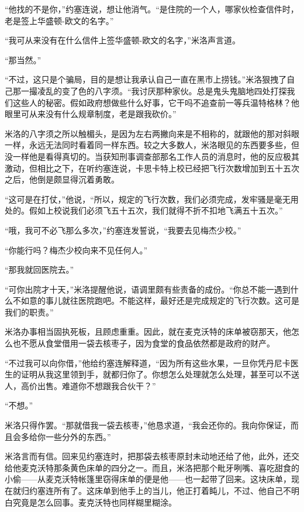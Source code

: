     “他找的不是你，”约塞连说，想让他消气。“是住院的一个人，哪家伙检查信件时，老是签上华盛顿-欧文的名字。”

    “我可从来没有在什么信件上签华盛顿-欧文的名字，”米洛声言道。

    “那当然。”

    “不过，这只是个骗局，目的是想让我承认自己一直在黑市上捞钱。”米洛狠拽了自己那一撮凌乱的变了色的八字须。“我讨厌那种家伙。总是鬼头鬼脑地四处打探我们这些人的秘密。假如政府想做些什么好事，它干吗不追查前一等兵温特格林？他眼里可从来没有什么规章制度，老是跟我砍价。”

    米洛的八字须之所以触楣头，是因为左右两撇向来是不相称的，就跟他的那对斜眼一样，永远无法同时看着同一样东西。较之大多数人，米洛眼见的东西要多些，但没一样他是看得真切的。当获知刑事调查部那名工作人员的消息时，他的反应极其激动，但相比之下，在听约塞连说，卡思卡特上校已经把飞行次数增加到五十五次之后，他倒是颇显得沉着勇敢。

    “这可是在打仗，”他说，“所以，规定的飞行次数，我们必须完成，发牢骚是毫无用处的。假如上校说我们必须飞五十五次，我们就得不折不扣地飞满五十五次。”

    “哦，我可不必飞那么多次，”约塞连发誓说，“我要去见梅杰少校。”

    “你能行吗？梅杰少校向来不见任何人。”

    “那我就回医院去。”

    “可你出院才十天，”米洛提醒他说，语调里颇有些责备的成份。“你总不能一遇到什么不如意的事儿就往医院跑吧。不能这样，最好还是完成规定的飞行次数。这可是我们的职责。”

    米洛办事相当固执死板，且顾虑重重。因此，就在麦克沃特的床单被窃那天，他怎么也不愿从食堂借用一袋去核枣子，因为食堂的食品依然都是政府的财产。
 


    “不过我可以向你借，”他给约塞连解释道，“因为所有这些水果，一旦你凭丹尼卡医生的证明从我这里领到手，就都归你了。你想怎么处理就怎么处理，甚至可以不送人，高价出售。难道你不想跟我合伙干？”

    “不想。”

    米洛只得作罢。“那就借我一袋去核枣，”他恳求道，“我会还你的。我向你保证，而且会多给你一些分外的东西。”

    米洛言而有信。回来见约塞连时，把那袋去核枣原封未动地还给了他，此外，还交给他麦克沃特那条黄色床单的四分之一。而且，米洛把那个毗牙咧嘴、喜吃甜食的小偷——从麦克沃特帐篷里窃得床单的便是他——也一起带了回来。这块床单，现在就归约塞连所有了。这床单到他手上的当儿，他正打着盹儿，不过、他自己不明白究竟是怎么回事。麦克沃特也同样糊里糊涂。

